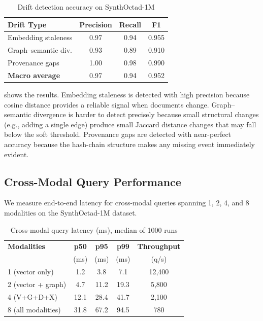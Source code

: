 \documentclass[11pt,twocolumn]{article}
\begin{document}
\begin{table}[t]
\centering
\caption{Drift detection accuracy on SynthOctad-1M}\label{tab:drift-accuracy}
\begin{tabular}{@{}lccc@{}}
\toprule
\textbf{Drift Type} & \textbf{Precision} & \textbf{Recall} & \textbf{F1} \\
\midrule
Embedding staleness      & 0.97 & 0.94 & 0.955 \\
Graph--semantic div.     & 0.93 & 0.89 & 0.910 \\
Provenance gaps          & 1.00 & 0.98 & 0.990 \\
\midrule
\textbf{Macro average}   & 0.97 & 0.94 & 0.952 \\
\bottomrule
\end{tabular}
\end{table}

 shows the results.  Embedding staleness is detected
with high precision because cosine distance provides a reliable signal when
documents change.  Graph--semantic divergence is harder to detect precisely
because small structural changes (e.g., adding a single edge) produce small
Jaccard distance changes that may fall below the soft threshold.  Provenance
gaps are detected with near-perfect accuracy because the hash-chain structure
makes any missing event immediately evident.

\subsection{Cross-Modal Query Performance}

We measure end-to-end latency for cross-modal queries spanning 1, 2, 4,
and 8 modalities on the SynthOctad-1M dataset.

\begin{table}[t]
\centering
\caption{Cross-modal query latency (ms), median of 1000 runs}\label{tab:query-latency}
\begin{tabular}{@{}lcccc@{}}
\toprule
\textbf{Modalities} & \textbf{p50} & \textbf{p95} & \textbf{p99} & \textbf{Throughput} \\
 & (ms) & (ms) & (ms) & (q/s) \\
\midrule
1 (vector only)     &  1.2 &  3.8 &  7.1 & 12{,}400 \\
2 (vector + graph)  &  4.7 & 11.2 & 19.3 &  5{,}800 \\
4 (V+G+D+X)        & 12.1 & 28.4 & 41.7 &  2{,}100 \\
8 (all modalities)  & 31.8 & 67.2 & 94.5 &    780 \\
\bottomrule
\end{tabular}
\end{table}
\end{document}
